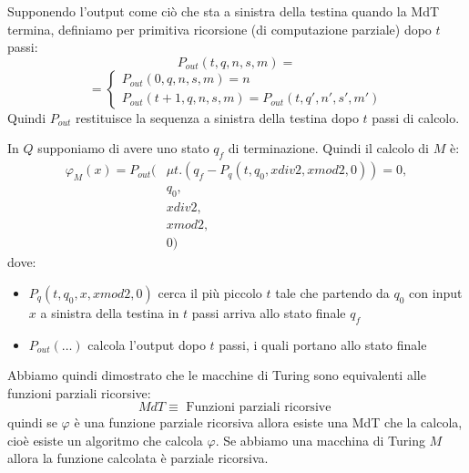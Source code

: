 \documentclass[a4paper]{article}
\begin{document}
\begin{theorem}
\begin{itemize}
    Supponendo l'output come ciò che sta a sinistra della testina quando la MdT termina,
    definiamo per primitiva ricorsione (di computazione parziale) dopo \( t \) passi:
    \[
      P_{out}(t, q, n, s, m) =
    \] 
    \[
      = \begin{cases}
        P_{out}(0, q, n, s, m) = n \\
        P_{out}(t+1, q, n, s, m) = P_{out}(t, q', n', s', m')
      \end{cases}
    \] 
    Quindi \( P_{out} \) restituisce la sequenza a sinistra della testina dopo \( t \)
    passi di calcolo.

    \vspace{1em}
    \noindent
    In \( Q \) supponiamo di avere uno stato \( q_f \) di terminazione. Quindi il calcolo
    di \( M \) è:
    \[
      \begin{aligned}
        \varphi_M(x) = P_{out}(
          &\mu t. \left( q_f - P_q\left( t, q_0, x div 2, x mod 2, 0 \right)  \right) = 0,\\
          &q_0,\\
          &x div 2,\\
          & x mod 2,\\
          &0)
      \end{aligned}
    \] 
    dove:
    \begin{itemize}
      \item \( P_q\left( t, q_0, x, x mod 2, 0 \right) \) cerca il più piccolo \( t \) 
        tale che partendo da \( q_0 \) con input \( x \) a sinistra della testina in
        \( t \) passi arriva allo stato finale \( q_f \) 

      \item \( P_{out}(\ldots) \) calcola l'output dopo \( t \) passi, i quali portano
        allo stato finale
    \end{itemize}
  \end{itemize}
  Abbiamo quindi dimostrato che le macchine di Turing sono equivalenti alle funzioni
  parziali ricorsive:
  \[
    MdT \equiv \text{ Funzioni parziali ricorsive }
  \] 
  quindi se \( \varphi  \) è una funzione parziale ricorsiva allora esiste una MdT che la calcola,
  cioè esiste un algoritmo che calcola \( \varphi \).
  Se abbiamo una macchina di Turing \( M \) allora la funzione calcolata è parziale ricorsiva.
\end{theorem}
\end{document}
